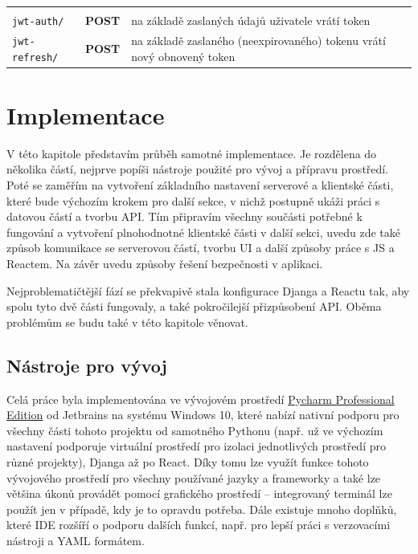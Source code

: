             {\centering
            \begin{tabular}{p{\apiA\textwidth} p{\apiB\textwidth} p{\apiC\textwidth}}&&\\
                \verb|jwt-auth/|            & \textbf{POST}     & na základě zaslaných údajů uživatele vrátí token\\
                \verb|jwt-refresh/|         & \textbf{POST}     & na základě zaslaného (neexpirovaného) tokenu vrátí nový obnovený token\\
            \end{tabular}}
            
    
\chapter{Implementace}\label{implementace}
V této kapitole představím průběh samotné implementace. Je rozdělena do několika částí, nejprve popíši nástroje použité pro vývoj a přípravu prostředí. Poté se zaměřím na vytvoření základního nastavení serverové a klientské části, které bude výchozím krokem pro další sekce, v nichž postupně ukáži práci s datovou částí a tvorbu API. Tím připravím všechny součásti potřebné k fungování a vytvoření plnohodnotné klientské části v další sekci, uvedu zde také způsob komunikace se serverovou částí, tvorbu UI a další způsoby práce s JS a Reactem. Na závěr uvedu způsoby řešení bezpečnosti v aplikaci.

Nejproblematičtější fází se překvapivě stala konfigurace Djanga a Reactu tak, aby spolu tyto dvě části fungovaly, a také pokročilejší přizpůsobení API. Oběma problémům se budu také v této kapitole věnovat.

    \section{Nástroje pro vývoj}\label{nastrojeprovyvoj}
    Celá práce byla implementována ve vývojovém prostředí \href{https://www.jetbrains.com/pycharm/}{Pycharm Professional Edition} od Jetbrains na systému Windows 10, které nabízí nativní podporu pro všechny části tohoto projektu od samotného Pythonu (např. už ve výchozím nastavení podporuje virtuální prostředí pro izolaci jednotlivých prostředí pro různé projekty), Djanga až po React. Díky tomu lze využít funkce tohoto vývojového prostředí pro všechny používané jazyky a frameworky a také lze většina úkonů provádět pomocí grafického prostředí -- integrovaný terminál lze použít jen v případě, kdy je to opravdu potřeba. Dále existuje mnoho doplňků, které IDE rozšíří o podporu dalších funkcí, např. pro lepší práci s verzovacími nástroji a YAML formátem.
    
